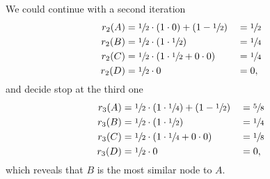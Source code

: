 We could continue with a second iteration
%
\begin{alignat*}{3}
  r_2(A) &= \sfrac{1}{2} \cdot (1\cdot0) + (1-\sfrac{1}{2}) &&= \sfrac{1}{2} \\
  r_2(B) &= \sfrac{1}{2} \cdot (1\cdot\sfrac{1}{2})         &&= \sfrac{1}{4} \\
  r_2(C) &= \sfrac{1}{2} \cdot (1\cdot\sfrac{1}{2}+0\cdot0) &&= \sfrac{1}{4} \\
  r_2(D) &= \sfrac{1}{2} \cdot 0                            && = 0,
\end{alignat*}
%
and decide stop at the third one
%
\begin{alignat*}{3}
  r_3(A) &= \sfrac{1}{2} \cdot (1\cdot\sfrac{1}{4}) + (1-\sfrac{1}{2}) &&= \sfrac{5}{8} \\
  r_3(B) &= \sfrac{1}{2} \cdot (1\cdot\sfrac{1}{2})                    &&= \sfrac{1}{4} \\
  r_3(C) &= \sfrac{1}{2} \cdot (1\cdot\sfrac{1}{4}+0\cdot0)            &&= \sfrac{1}{8} \\
  r_3(D) &= \sfrac{1}{2} \cdot 0                                       &&= 0,
\end{alignat*}
%
which reveals that $B$ is the most similar node to $A$.
